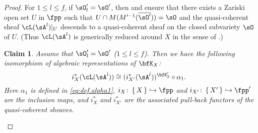 \documentclass[12pt,a4paper]{amsart}
\numberwithin{equation}{section}
\newtheorem*{claim*}{Claim}
\theoremstyle{remark}
\def\dliftv{\vartheta}
\def\slift{\cL}
\def\ZX{\cZ_{X}}
\def\bsOp{\overline{\sO'}}
\begin{document}
\begin{proof}
For $1\leq l \leq f$, if  $\sO'_l=\sO'$, then  and  ensure  that
there exists a Zariski open set $U$ in $\fpp$ such that $U \cap
M(M'^{-1}(\bsOp)) = \sO$ and the
quasi-coherent sheaf  $\slift(\sA^l)|_{U}$ descends to a quasi-coherent sheaf on the closed subvariety $\sO$ of $U$. (Thus $\slift(\sA^l)$ is generically reduced around
$X$ in the sense of  \cite[Proposition~2.9]{Vo89}.)




\begin{claim*}
Assume that $\sO'_l=\sO'$ ($1\leq l\leq f$). Then we have  the following isomorphism
of algebraic representations of $\bfK_X$:
\[%
   i^*_{X}(\slift(\sA^l))\cong (i^*_{X'}(\sA^l))^{\bfK'_2} \circ \alpha_1.
 \]%
 Here $\alpha_1$ is
 defined in \cref{eq:def.alpha1}, $i_X\colon \set{X}\hookrightarrow \fpp$ and
 $i_{X'}\colon \set{X'}\hookrightarrow \fpp'$ are the inclusion maps, and
 $i^*_{X}$ and $ i^*_{X'}$ are the associated pull-back functors of the
 quasi-coherent sheaves.
\end{claim*}



  \def\mX{\rmm_{\fpp}(X)} \def\kX{\kappa(X)}
  \def\ZX{\cZ_X}
  \def\ZXO{Z_{X,\bsOp}}


\end{proof}
\end{document}
